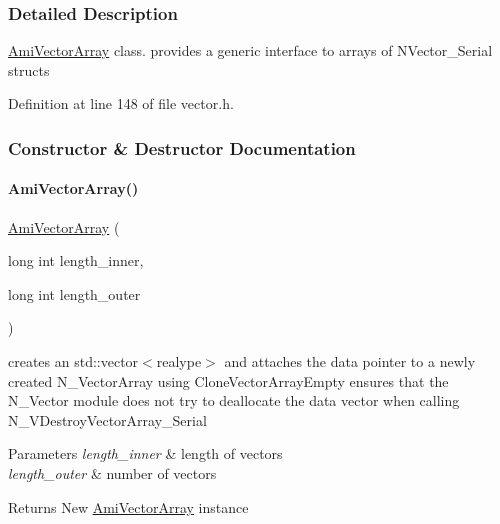 \subsubsection{Detailed Description}
\mbox{\hyperlink{classamici_1_1_ami_vector_array}{Ami\+Vector\+Array}} class. provides a generic interface to arrays of N\+Vector\+\_\+\+Serial structs 

Definition at line 148 of file vector.\+h.



\subsubsection{Constructor \& Destructor Documentation}
\mbox{\label{classamici_1_1_ami_vector_array_a331a7814672b817a7c38328e78eaaedd}} 
\paragraph{\texorpdfstring{Ami\+Vector\+Array()}{AmiVectorArray()}\hspace{0.1cm}{\footnotesize\ttfamily [1/2]}}
{\footnotesize\ttfamily \mbox{\hyperlink{classamici_1_1_ami_vector_array}{Ami\+Vector\+Array}} (\begin{DoxyParamCaption}\item[{long int}]{length\+\_\+inner,  }\item[{long int}]{length\+\_\+outer }\end{DoxyParamCaption})}

creates an std\+::vector$<$realype$>$ and attaches the data pointer to a newly created N\+\_\+\+Vector\+Array using Clone\+Vector\+Array\+Empty ensures that the N\+\_\+\+Vector module does not try to deallocate the data vector when calling N\+\_\+\+V\+Destroy\+Vector\+Array\+\_\+\+Serial 
\begin{DoxyParams}{Parameters}
{\em length\+\_\+inner} & length of vectors \\
\hline
{\em length\+\_\+outer} & number of vectors \\
\hline
\end{DoxyParams}
\begin{DoxyReturn}{Returns}
New \mbox{\hyperlink{classamici_1_1_ami_vector_array}{Ami\+Vector\+Array}} instance 
\end{DoxyReturn}


